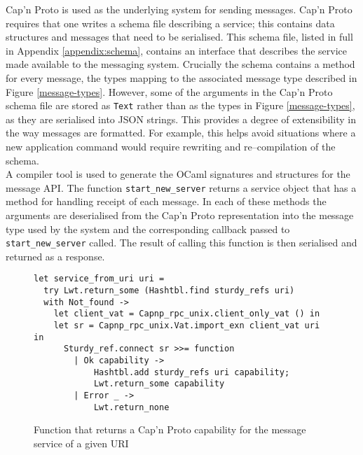 Cap'n Proto is used as the underlying system for sending messages. Cap'n Proto requires that one writes a schema file describing a service; this contains data structures and messages that need to be serialised. This schema file, listed in full in Appendix \ref{appendix:schema}, contains an interface that describes the service made available to the messaging system. Crucially the schema contains a method for every message, the types mapping to the associated message type described in Figure \ref{message-types}. However, some of the arguments in the Cap'n Proto schema file are stored as \texttt{Text} rather than as the types in Figure \ref{message-types}, as they are serialised into JSON strings. This provides a degree of extensibility in the way messages are formatted. For example, this helps avoid situations where a new application command would require rewriting and re--compilation of the schema. \\

A compiler tool is used to generate the OCaml signatures and structures for the message API. The function \texttt{start\_new\_server} returns a service object that has a method for handling receipt of each message. In each of these methods the arguments are deserialised from the Cap'n Proto representation into the message type used by the system and the corresponding callback passed to \texttt{start\_new\_server} called. The result of calling this function is then serialised and returned as a response. \\

\begin{figure}
  \begin{lstlisting}
let service_from_uri uri =
  try Lwt.return_some (Hashtbl.find sturdy_refs uri)
  with Not_found ->
    let client_vat = Capnp_rpc_unix.client_only_vat () in
    let sr = Capnp_rpc_unix.Vat.import_exn client_vat uri in
      Sturdy_ref.connect sr >>= function
        | Ok capability ->
            Hashtbl.add sturdy_refs uri capability;
            Lwt.return_some capability
        | Error _ -> 
            Lwt.return_none
  \end{lstlisting}
  \centering
  \caption{Function that returns a Cap'n Proto capability for the message service of a given URI}
  \label{fig:service-from-uri}
\end{figure}

